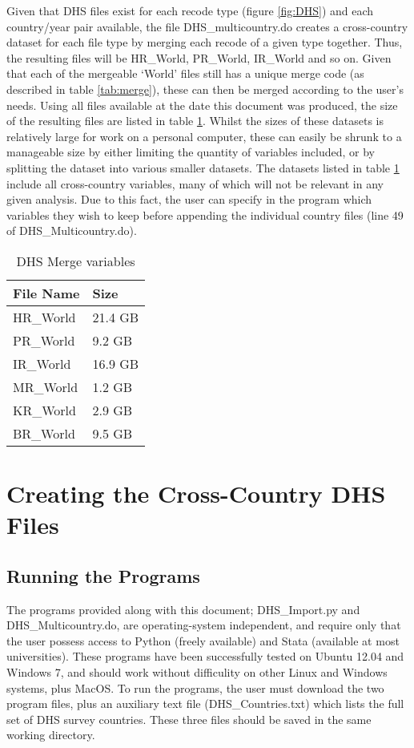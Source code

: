 \documentclass{article}[11pt,subeqn]
\begin{document}
\begin{spacing}{1.25}
Given that DHS files exist for each recode type (figure \ref{fig:DHS}) and each country/year pair available, 
the file DHS\_multicountry.do creates a cross-country dataset for each file type by merging each recode of a 
given type together.  Thus, the resulting files will be HR\_World, PR\_World, IR\_World and so on.  Given that 
each of the mergeable `World' files still has a unique merge code (as described in table \ref{tab:merge}), 
these can then be merged according to the user's needs.  Using all files available at the date this document was 
produced, the size of the resulting files are listed in table \ref{tab:files}.  Whilst the sizes of these datasets
is relatively large for work on a personal computer, these can easily be shrunk to a manageable size by either
limiting the quantity of variables included, or by splitting the dataset into various smaller datasets.  The
datasets listed in table \ref{tab:files} include all cross-country variables, many of which will not be relevant
in any given analysis.  Due to this fact, the user can specify in the program which variables they wish to keep
before appending the individual country files (line 49 of DHS\_Multicountry.do).

\begin{table}[htpb!]
\begin{center}
\caption{DHS Merge variables}
\label{tab:files}
\begin{tabular}{ll} 
\toprule
File Name & Size \\
\midrule
HR\_World & 21.4 GB \\
PR\_World & 9.2 GB \\
IR\_World & 16.9 GB \\
MR\_World & 1.2 GB \\
KR\_World & 2.9 GB \\
BR\_World & 9.5 GB \\
\bottomrule
\end{tabular}
\end{center}
\end{table}

\section{Creating the Cross-Country DHS Files}
\subsection{Running the Programs}
The programs provided along with this document; DHS\_Import.py and DHS\_Multicountry.do, are operating-system
independent, and require only that the user possess access to Python (freely available) and Stata (available at most 
universities).  These programs have been successfully tested on Ubuntu 12.04 and Windows 7, and should work
without difficulity on other Linux and Windows systems, plus MacOS. To run the programs, the user must download
the two program files, plus an auxiliary text file (DHS\_Countries.txt) which lists the full set of DHS survey countries.
These three files should be saved in the same working directory.


\end{spacing}
\end{document}
